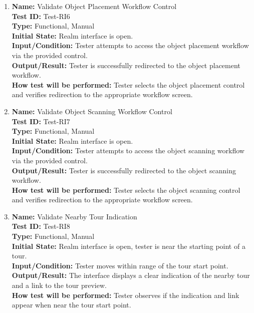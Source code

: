\documentclass[12pt, titlepage]{article}
\begin{document}
\begin{enumerate}
  \item \textbf{Name:} Validate Object Placement Workflow Control \label{itm:Test-RI6} \\
        \textbf{Test ID:} Test-RI6 \\
        \textbf{Type:} Functional, Manual \\
        \textbf{Initial State:} Realm interface is open. \\
        \textbf{Input/Condition:} Tester attempts to access the object placement workflow via the provided control. \\
        \textbf{Output/Result:} Tester is successfully redirected to the object placement workflow. \\
        \textbf{How test will be performed:} Tester selects the object placement control and verifies redirection to the appropriate workflow screen.

  \item \textbf{Name:} Validate Object Scanning Workflow Control \label{itm:Test-RI7} \\
        \textbf{Test ID:} Test-RI7 \\
        \textbf{Type:} Functional, Manual \\
        \textbf{Initial State:} Realm interface is open. \\
        \textbf{Input/Condition:} Tester attempts to access the object scanning workflow via the provided control. \\
        \textbf{Output/Result:} Tester is successfully redirected to the object scanning workflow. \\
        \textbf{How test will be performed:} Tester selects the object scanning control and verifies redirection to the appropriate workflow screen.


  \item \textbf{Name:} Validate Nearby Tour Indication \label{itm:Test-RI8} \\
        \textbf{Test ID:} Test-RI8 \\
        \textbf{Type:} Functional, Manual \\
        \textbf{Initial State:} Realm interface is open, tester is near the starting point of a tour. \\
        \textbf{Input/Condition:} Tester moves within range of the tour start point. \\
        \textbf{Output/Result:} The interface displays a clear indication of the nearby tour and a link to the tour preview. \\
        \textbf{How test will be performed:} Tester observes if the indication and link appear when near the tour start point.


\end{enumerate}
\end{document}

